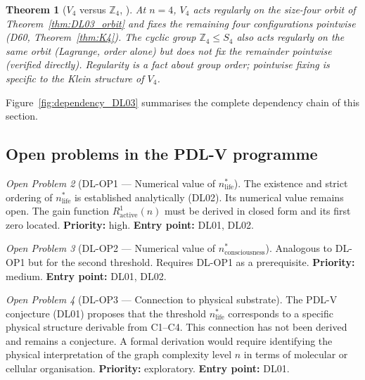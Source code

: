 \documentclass[11pt,a4paper]{article}
\theoremstyle{plain}
\newtheorem{theorem}{Theorem}[section]
\theoremstyle{definition}
\theoremstyle{remark}
\newtheorem{openproblem}[theorem]{Open Problem}
\begin{document}
\begin{theorem}[\texorpdfstring{$V_4$}{V4} versus \texorpdfstring{$\mathbb{Z}_4$}{Z4}, \cite{DL03}]
\label{thm:DL03_v4z4}
At $n=4$, $V_4$ acts regularly on the size-four orbit of Theorem~\ref{thm:DL03_orbit} and fixes the remaining four configurations pointwise (D60, Theorem~\ref{thm:K4}). The cyclic group $\mathbb{Z}_4\le S_4$ also acts regularly on the same orbit (Lagrange, order alone) but does \emph{not} fix the remainder pointwise (verified directly). Regularity is a fact about group order; pointwise fixing is specific to the Klein structure of $V_4$.
\end{theorem}

Figure~\ref{fig:dependency_DL03} summarises the complete dependency chain of this section.

\subsection{Open problems in the PDL-V programme}

\begin{openproblem}[DL-OP1 --- Numerical value of $n^*_{\mathrm{life}}$]
\label{op:DL_nlife}
The existence and strict ordering of $n^*_{\mathrm{life}}$ is established analytically (DL02). Its numerical value remains open. The gain function $R^1_{\mathrm{active}}(n)$ must be derived in closed form and its first zero located. \textbf{Priority:} high. \textbf{Entry point:} DL01, DL02.
\end{openproblem}

\begin{openproblem}[DL-OP2 --- Numerical value of $n^*_{\mathrm{consciousness}}$]
\label{op:DL_nconsciousness}
Analogous to DL-OP1 but for the second threshold. Requires DL-OP1 as a prerequisite. \textbf{Priority:} medium. \textbf{Entry point:} DL01, DL02.
\end{openproblem}

\begin{openproblem}[DL-OP3 --- Connection to physical substrate]
\label{op:DL_substrate}
The PDL-V conjecture (DL01) proposes that the threshold $n^*_{\mathrm{life}}$ corresponds to a specific physical structure derivable from C1--C4. This connection has not been derived and remains a conjecture. A formal derivation would require identifying the physical interpretation of the graph complexity level $n$ in terms of molecular or cellular organisation. \textbf{Priority:} exploratory. \textbf{Entry point:} DL01.
\end{openproblem}
\end{document}
